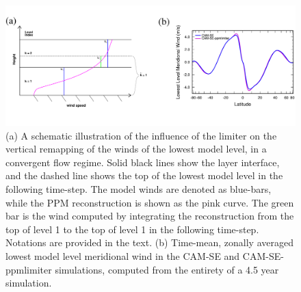 \begin{figure}[h]
\centering
\includegraphics[width=30pc]{figs/schematic.pdf}
\caption{(a) A schematic illustration of the influence of the limiter on the vertical remapping of the winds of the lowest model level, in a convergent flow regime. Solid black lines show the layer interface, and the dashed line shows the top of the lowest model level in the following time-step. The model winds are denoted as blue-bars, while the PPM reconstruction is shown as the pink curve. The green bar is the wind computed by integrating the reconstruction from the top of level 1 to the top of level 1 in the following time-step. Notations are provided in the text. (b) Time-mean, zonally averaged lowest model level meridional wind in the CAM-SE and CAM-SE-ppmlimiter simulations, computed from the entirety of a 4.5 year simulation.}
\label{fig:schematic}
\end{figure}

